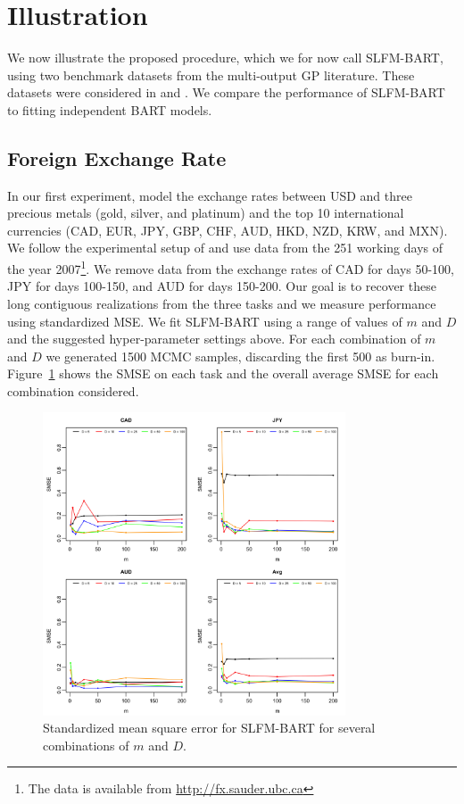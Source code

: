 \documentclass[12pt]{article}
\begin{document}
\section{Illustration}
\label{sec:illustration}

We now illustrate the proposed procedure, which we for now call SLFM-BART, using two benchmark datasets from the multi-output GP literature.
These datasets were considered in \citet{Nguyen2014} and \citet{Requeima2019}.
We compare the performance of SLFM-BART to fitting independent BART models.

\subsection{Foreign Exchange Rate}

In our first experiment, model the exchange rates between USD and three precious metals (gold, silver, and platinum) and the top 10 international currencies (CAD, EUR, JPY, GBP, CHF, AUD, HKD, NZD, KRW, and MXN).
We follow the experimental setup of \citet{Alvarez2010} and use data from the 251 working days of the year 2007\footnote{The data is available from \url{http://fx.sauder.ubc.ca}}. 
We remove data from the exchange rates of CAD for days 50-100, JPY for days 100-150, and AUD for days 150-200.
Our goal is to recover these long contiguous realizations from the three tasks and we measure performance using standardized MSE.
We fit SLFM-BART using a range of values of $m$ and $D$ and the suggested hyper-parameter settings above.
For each combination of $m$ and $D$ we generated 1500 MCMC samples, discarding the first 500 as burn-in.
Figure~\ref{fig:forex_slfm_smse} shows the SMSE on each task and the overall average SMSE for each combination considered.

\begin{figure}[H]
\centering
\includegraphics[width = 0.8\textwidth]{../images/forex_slfm_smse.png}
\caption{Standardized mean square error for SLFM-BART for several combinations of $m$ and $D.$}
\label{fig:forex_slfm_smse}
\end{figure}
\end{document}
